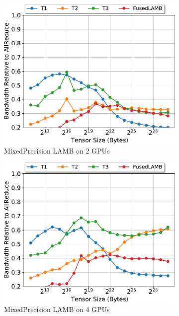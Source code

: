 \begin{figure}
  \begin{subfigure}{0.66\columnwidth}
    \includegraphics[width=\columnwidth]{figures/results-lambfp16-2-gpus.pdf} 
    \caption{MixedPrecision LAMB on 2 GPUs} 
  \end{subfigure}
  \begin{subfigure}{0.66\columnwidth}
    \includegraphics[width=\columnwidth]{figures/results-lambfp16-4-gpus.pdf}  
    \caption{MixedPrecision LAMB on 4 GPUs} 
  \end{subfigure}
  \begin{subfigure}{0.66\columnwidth}

\end{subfigure}
\end{figure}

